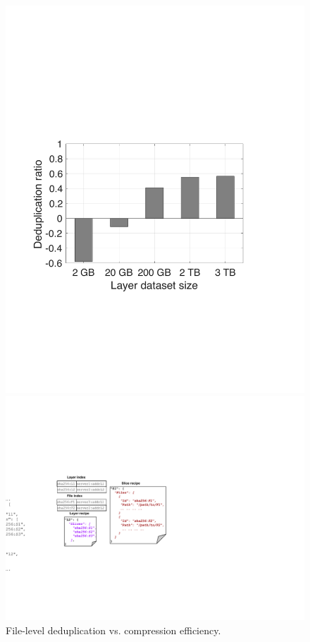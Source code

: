 \begin{figure}[t]
		\begin{minipage}{0.21\linewidth}
			\centering
			\includegraphics[width=1\textwidth]{graphs/dedup_vs_compression.pdf}
			\caption{File-level deduplication vs. compression efficiency.}
			\label{fig:cacheefficiency}
		\end{minipage}
			\begin{minipage}{0.38\linewidth}
				\centering
				\includegraphics[width=1\textwidth]{graphs/sift-metadata.pdf}

\end{minipage}
\end{figure}
